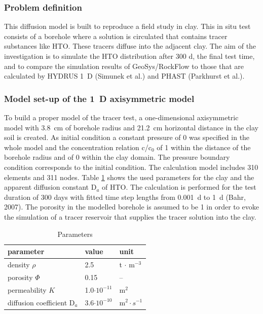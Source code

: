 
\subsubsection*{Problem definition}

This diffusion model is built to reproduce a field study in clay. This in situ test consists of a borehole where a solution is circulated that contains tracer substances like HTO. These tracers diffuse into the adjacent clay. The aim of the investigation is to simulate the HTO distribution after 300 d, the final test time, and to compare the simulation results of GeoSys/RockFlow to those that are calculated by HYDRUS 1~D (Simunek et al.) and PHAST (Parkhurst et al.).

\subsubsection*{Model set-up of the 1~D axisymmetric model}

To build a proper model of the tracer test, a one-dimensional axisymmetric model with 3.8~cm of borehole radius and 21.2~cm horizontal distance in the clay soil is created. As initial condition a constant pressure of 0 was specified in the whole model and the concentration relation c/c$_0$ of 1 within the distance of the borehole radius and of 0 within the clay domain. The pressure boundary condition corresponds to the initial condition. The calculation model includes 310 elements and 311 nodes. Table \ref{tab53} shows the used parameters for the clay and the apparent diffusion constant D$_a$ of HTO. The calculation is performed for the test duration of 300 days with fitted time step lengths from 0.001~d to 1~d (Bahr, 2007). The porosity in the modelled borehole is assumed to be 1 in order to evoke the simulation of a tracer reservoir that supplies the tracer solution into the clay.

\begin{table}[htbp]
\centering
\begin{tabular}{|l|l|l|}
\hline
parameter & value & unit \\
\hline
density $\rho$  & 2.5 & t $\cdot$ m$^{-3}$  \\			
\hline
porosity $\Phi$ & 0.15 & -- \\
\hline
permeability $K$ & 1.0$\cdot 10^{-11}$ & m$^2$ \\
\hline
diffusion coefficient D$_a$ & 3.6$\cdot 10^{-10}$ & m$^2\cdot s^{-1}$  \\
\hline
\end{tabular}
\caption{Parameters}
\label{tab53}
\end{table}

